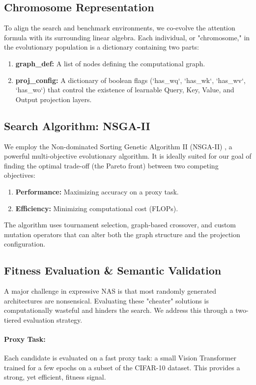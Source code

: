 \documentclass[11pt, a4paper]{article}
\begin{document}
\subsection{Chromosome Representation}
To align the search and benchmark environments, we co-evolve the attention formula with its surrounding linear algebra. Each individual, or "chromosome," in the evolutionary population is a dictionary containing two parts:
\begin{enumerate}
    \item \textbf{graph\_def:} A list of nodes defining the computational graph.
    \item \textbf{proj\_config:} A dictionary of boolean flags (`has_wq`, `has_wk`, `has_wv`, `has_wo`) that control the existence of learnable Query, Key, Value, and Output projection layers.
\end{enumerate}

\subsection{Search Algorithm: NSGA-II}
We employ the Non-dominated Sorting Genetic Algorithm II (NSGA-II) \cite{deb2002fast}, a powerful multi-objective evolutionary algorithm. It is ideally suited for our goal of finding the optimal trade-off (the Pareto front) between two competing objectives:
\begin{enumerate}
    \item \textbf{Performance:} Maximizing accuracy on a proxy task.
    \item \textbf{Efficiency:} Minimizing computational cost (FLOPs).
\end{enumerate}
The algorithm uses tournament selection, graph-based crossover, and custom mutation operators that can alter both the graph structure and the projection configuration.

\subsection{Fitness Evaluation \& Semantic Validation}
A major challenge in expressive NAS is that most randomly generated architectures are nonsensical. Evaluating these "cheater" solutions is computationally wasteful and hinders the search. We address this through a two-tiered evaluation strategy.

\paragraph{Proxy Task:} Each candidate is evaluated on a fast proxy task: a small Vision Transformer trained for a few epochs on a subset of the CIFAR-10 dataset. This provides a strong, yet efficient, fitness signal.
\end{document}
